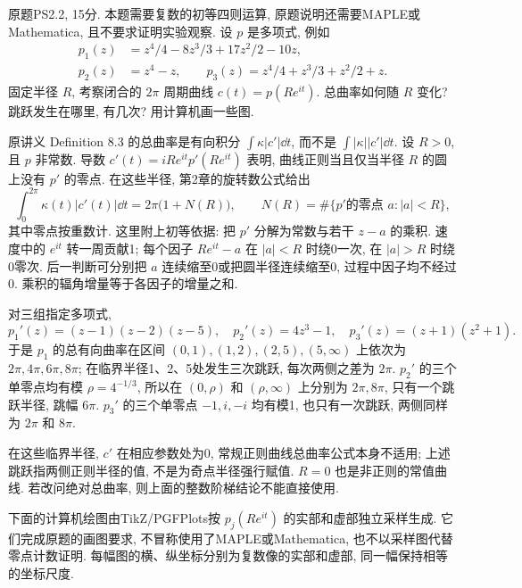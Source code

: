 \begin{exercise}\label{ps:2-2}
原题PS2.2, 15分. 本题需要复数的初等四则运算, 原题说明还需要MAPLE或Mathematica, 且不要求证明实验观察. 设 $p$ 是多项式, 例如
\[
\begin{aligned}
 p_1(z)&=z^4/4-8z^3/3+17z^2/2-10z,\\
 p_2(z)&=z^4-z,\qquad
 p_3(z)=z^4/4+z^3/3+z^2/2+z.
\end{aligned}
\]
固定半径 $R$, 考察闭合的 $2\pi$ 周期曲线 $c(t)=p(Re^{it})$. 总曲率如何随 $R$ 变化? 跳跃发生在哪里, 有几次? 用计算机画一些图.
\end{exercise}
\begin{solution}\label{pssol:2-2}
原讲义 Definition 8.3 的总曲率是有向积分 $\int\kappa|c'|\dd t$, 而不是 $\int|\kappa||c'|\dd t$. 设 $R>0$, 且 $p$ 非常数. 导数 $c'(t)=iRe^{it}p'(Re^{it})$ 表明, 曲线正则当且仅当半径 $R$ 的圆上没有 $p'$ 的零点. 在这些半径, 第2章的旋转数公式给出
\[
 \int_0^{2\pi}\kappa(t)|c'(t)|\dd t=2\pi\bigl(1+N(R)\bigr),
 \qquad N(R)=\#\{p'\text{的零点 }a:|a|<R\},
\]
其中零点按重数计. 这里附上初等依据: 把 $p'$ 分解为常数与若干 $z-a$ 的乘积. 速度中的 $e^{it}$ 转一周贡献1; 每个因子 $Re^{it}-a$ 在 $|a|<R$ 时绕0一次, 在 $|a|>R$ 时绕0零次. 后一判断可分别把 $a$ 连续缩至0或把圆半径连续缩至0, 过程中因子均不经过0. 乘积的辐角增量等于各因子的增量之和.

对三组指定多项式,
\[
 p_1'(z)=(z-1)(z-2)(z-5),\quad
 p_2'(z)=4z^3-1,\quad p_3'(z)=(z+1)(z^2+1).
\]
于是 $p_1$ 的总有向曲率在区间 $(0,1),(1,2),(2,5),(5,\infty)$ 上依次为 $2\pi,4\pi,6\pi,8\pi$; 在临界半径1、2、5处发生三次跳跃, 每次两侧之差为 $2\pi$. $p_2'$ 的三个单零点均有模 $\rho=4^{-1/3}$, 所以在 $(0,\rho)$ 和 $(\rho,\infty)$ 上分别为 $2\pi,8\pi$, 只有一个跳跃半径, 跳幅 $6\pi$. $p_3'$ 的三个单零点 $-1,i,-i$ 均有模1, 也只有一次跳跃, 两侧同样为 $2\pi$ 和 $8\pi$.

在这些临界半径, $c'$ 在相应参数处为0, 常规正则曲线总曲率公式本身不适用; 上述跳跃指两侧正则半径的值, 不是为奇点半径强行赋值. $R=0$ 也是非正则的常值曲线. 若改问绝对总曲率, 则上面的整数阶梯结论不能直接使用.

下面的计算机绘图由TikZ/PGFPlots按 $p_j(Re^{it})$ 的实部和虚部独立采样生成. 它们完成原题的画图要求, 不冒称使用了MAPLE或Mathematica, 也不以采样图代替零点计数证明. 每幅图的横、纵坐标分别为复数像的实部和虚部, 同一幅保持相等的坐标尺度.
\end{solution}

